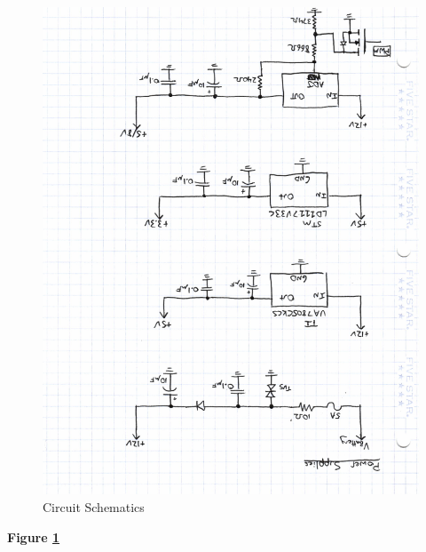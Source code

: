 \documentclass[12pt,letterpaper]{article}
\begin{document}
\begin{figure}[H]
\centering
\includegraphics[page=3, totalheight=20cm, angle=180]{images/circuit_sch.pdf}
\caption{Circuit Schematics}
\label{fig:pwm/vpw}
\end{figure}

\textbf{Figure \ref{fig:pwm/vpw}} 
\end{document}
